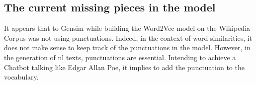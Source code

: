 \subsection{The current missing pieces in the model}
It appears that to Gensim while building the Word2Vec model on the Wikipedia Corpus was not using punctuations. Indeed, in the context of word similarities, it does not make sense to keep track of the punctuations in the model. However, in the generation of \gls{nl} texts, punctuations are essential. Intending to achieve a Chatbot talking like Edgar Allan Poe, it implies to add the punctuation to the vocabulary.
